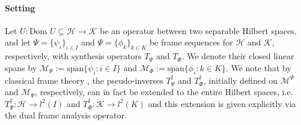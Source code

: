 \documentclass[reqno,10pt]{amsart}
\theoremstyle{plain}
\theoremstyle{definition}
\newcommand{\cal}[1]{\mathcal{#1}}
\begin{document}
    \paragraph{\bf Setting}Let $U: \text{Dom }U \subseteq \cal H \to \cal K$ be an operator between two separable Hilbert spaces, and let $\Psi = \{\psi_i\}_{i\in I}$ and $\Psi = \{\phi_k\}_{k \in K}$ be frame sequences for $\cal H$ and $\cal K$, respectively, with synthesis operators $T_\Psi$ and $T_\Phi$. We denote their closed linear spans by $\cal M_\Psi := \overline{\text{span}}\{\psi_i : i \in I\}$ and $\cal M_\Phi := \overline{\text{span}}\{\phi_i : k \in K\}$. We note that by classical frame theory \cite{Christensen2008-gk}, the pseudo-inverses $T_\Psi^\dag$ and $T_\Phi^\dag$, initially defined on $\cal M^\Psi$ and $\cal M_\Psi$, respectively, can in fact be extended to the entire Hilbert spaces, i.e. $T_\Psi^\dag : \cal H \to l^2(I)$ and $T_\Phi^\dag : \cal K \to l^2(K)$ and this extension is given explicitly via the dual frame analysis operator.
\end{document}
